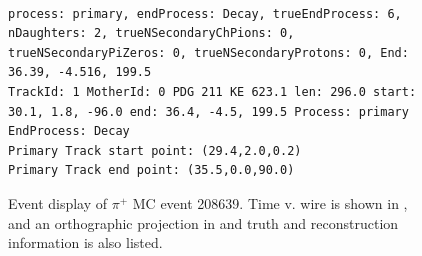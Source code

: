 \documentclass[letterpaper,12pt]{article}
\newcommand{\pip}{\ensuremath{\pi^{+}}}
\begin{document}
\begin{figure}[!hbtp]
  \begin{center}
\\
\begin{lstlisting}
process: primary, endProcess: Decay, trueEndProcess: 6, nDaughters: 2, trueNSecondaryChPions: 0, trueNSecondaryPiZeros: 0, trueNSecondaryProtons: 0, End: 36.39, -4.516, 199.5
TrackId: 1 MotherId: 0 PDG 211 KE 623.1 len: 296.0 start: 30.1, 1.8, -96.0 end: 36.4, -4.5, 199.5 Process: primary EndProcess: Decay
Primary Track start point: (29.4,2.0,0.2)
Primary Track end point: (35.5,0.0,90.0)
\end{lstlisting}
    \caption{%
                Event display of \pip{} MC event 208639. 
                Time v. wire is shown in , 
                and an orthographic projection in 
                and truth and reconstruction information is also listed.
            }
    \label{fig:evd_pipMC_208639}
  \end{center}
\end{figure}
\end{document}
